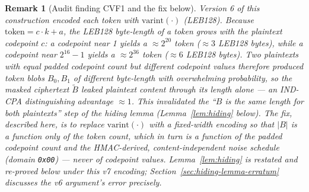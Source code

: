 \documentclass[11pt,a4paper]{article}
\newtheorem{remark}[theorem]{Remark}
\begin{document}
\begin{remark}[Audit finding CVF1 and the fix below]
Version 6 of this construction encoded each token with
$\mathrm{varint}(\cdot)$ (LEB128). Because $\mathrm{token} = c \cdot k + a$,
the LEB128 byte-length of a token grows with the plaintext codepoint $c$: a
codepoint near 1 yields a $\approx 2^{20}$ token ($\approx 3$ LEB128 bytes),
while a codepoint near $2^{16}-1$ yields a $\approx 2^{36}$ token
($\approx 6$ LEB128 bytes). Two plaintexts with equal padded codepoint
count but different codepoint values therefore produced token blobs
$B_0, B_1$ of \emph{different byte-length} with overwhelming probability,
so the masked ciphertext $\widetilde{B}$ leaked plaintext content through
its length alone --- an IND-CPA distinguishing advantage $\approx 1$. This
invalidated the ``$B$ is the same length for both plaintexts'' step of the
hiding lemma (Lemma~\ref{lem:hiding} below). The fix, described here, is to
replace $\mathrm{varint}(\cdot)$ with a fixed-width encoding so that
$\lvert B \rvert$ is a function only of the token \emph{count}, which in
turn is a function of the padded codepoint count and the HMAC-derived,
content-independent noise schedule (domain \texttt{0x00}) --- never of
codepoint values. Lemma~\ref{lem:hiding} is restated and re-proved below
under this v7 encoding; Section~\ref{sec:hiding-lemma-erratum} discusses the
v6 argument's error precisely.
\end{remark}
\end{document}
